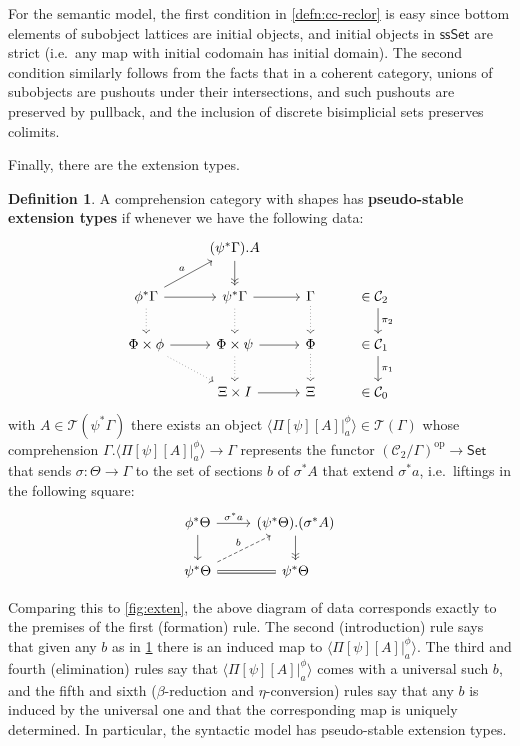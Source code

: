 \documentclass{amsart}
\theoremstyle{plain}
\theoremstyle{definition}
\newtheorem{defn}[thm]{Definition}
\theoremstyle{remark}
\numberwithin{equation}{section}
\newcommand{\ccexten}[4]{\langle\Pi[#1][#2] |^{#3}_{#4}\rangle}
\newcommand{\Set}{\mathsf{Set}}
\newcommand{\ssSet}{\mathsf{ssSet}}
\newcommand{\op}{\mathrm{op}}
\newcommand{\C}{\mathcal{C}}
\newcommand{\T}{\mathcal{T}}
\begin{document}
For the semantic model, the first condition in \cref{defn:cc-reclor} is easy since bottom elements of subobject lattices are initial objects, and initial objects in $\ssSet$ are strict (i.e.\ any map with initial codomain has initial domain).
The second condition similarly follows from the facts that in a coherent category, unions of subobjects are pushouts under their intersections, and such pushouts are preserved by pullback, and the inclusion of discrete bisimplicial sets preserves colimits.

Finally, there are the extension types.


\begin{defn}\label{defn:cc-exten}
  A comprehension category with shapes has \textbf{pseudo-stable extension types} if whenever we have the following data:
  \begin{equation}\label{eq:ccexten}
  \begin{tikzcd}
    & (\psi^*\Gamma).A \ar[d,->>]\\
    \phi^*\Gamma \ar[r] \ar[d,dotted] \ar[ur,"a"] & \psi^*\Gamma \ar[r] \ar[d,dotted] & \Gamma \ar[d,dotted] & \in \C_2 \ar[d,"\pi_2",shift left]\\
    \Phi\times \phi \ar[r] \ar[dr,dotted] &\Phi \times \psi \ar[r] \ar[d,dotted] & \Phi \ar[d,dotted] & \in \C_1 \ar[d,"\pi_1",shift left]\\
    &\Xi\times I \ar[r] & \Xi & \in\C_0
  \end{tikzcd}
  \end{equation}
  with $A\in\T(\psi^*\Gamma)$ there exists an object $\ccexten{\psi}{A}{\phi}{a} \in \T(\Gamma)$ whose comprehension
  $\Gamma.\ccexten{\psi}{A}{\phi}{a} \to \Gamma$
represents the functor $(\C_2/\Gamma)^\op\to\Set$ that sends $\sigma:\Theta\to\Gamma$ to the set of sections $b$ of $\sigma^*A$ that extend $\sigma^*a$, i.e.\ liftings in the following square:
  \begin{equation}
  \begin{tikzcd}
    \phi^*\Theta \ar[r,"\sigma^*a"] \ar[d] & (\psi^*\Theta).(\sigma^*A) \ar[d,->>]\\
    \psi^*\Theta \ar[r,equals] \ar[ur,dashed,"b"] & \psi^*\Theta
  \end{tikzcd}\label{eq:ccexten-lift}
  \end{equation}
\end{defn}

Comparing this to \cref{fig:exten}, the above diagram of data corresponds exactly to the premises of the first (formation) rule.
The second (introduction) rule says that given any $b$ as in \cref{defn:cc-exten} there is an induced map to $\ccexten{\psi}{A}{\phi}{a}$.
The third and fourth (elimination) rules say that $\ccexten{\psi}{A}{\phi}{a}$ comes with a universal such $b$, and the fifth and sixth ($\beta$-reduction and $\eta$-conversion) rules say that any $b$ is induced by the universal one and that the corresponding map is uniquely determined.
In particular, the syntactic model has pseudo-stable extension types.
\end{document}
